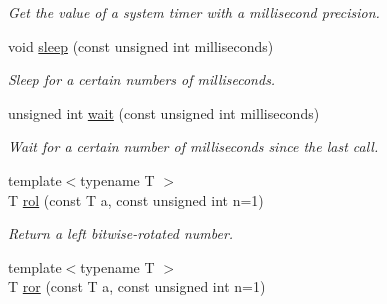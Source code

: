 \begin{DoxyCompactItemize}
\begin{DoxyCompactList}\small\item\em Get the value of a system timer with a millisecond precision. \item\end{DoxyCompactList}\item 
void \hyperlink{namespacecimg__library_1_1cimg_a3ac7655e49556a90715f3532af221334}{sleep} (const unsigned int milliseconds)
\begin{DoxyCompactList}\small\item\em Sleep for a certain numbers of milliseconds. \item\end{DoxyCompactList}\item 
unsigned int \hyperlink{namespacecimg__library_1_1cimg_a3c8917c0f12139bff6de6e3e45fc5b77}{wait} (const unsigned int milliseconds)
\begin{DoxyCompactList}\small\item\em Wait for a certain number of milliseconds since the last call. \item\end{DoxyCompactList}\item 
\hypertarget{namespacecimg__library_1_1cimg_ae75f9e2255c8e98eb0cca3b6716f8746}{
{\footnotesize template$<$typename T $>$ }\\T \hyperlink{namespacecimg__library_1_1cimg_ae75f9e2255c8e98eb0cca3b6716f8746}{rol} (const T a, const unsigned int n=1)}
\label{namespacecimg__library_1_1cimg_ae75f9e2255c8e98eb0cca3b6716f8746}

\begin{DoxyCompactList}\small\item\em Return a left bitwise-\/rotated number. \item\end{DoxyCompactList}\item 
\hypertarget{namespacecimg__library_1_1cimg_a93db8c89493d24df38c6578b6ee9980a}{
{\footnotesize template$<$typename T $>$ }\\T \hyperlink{namespacecimg__library_1_1cimg_a93db8c89493d24df38c6578b6ee9980a}{ror} (const T a, const unsigned int n=1)}
\label{namespacecimg__library_1_1cimg_a93db8c89493d24df38c6578b6ee9980a}


\end{DoxyCompactItemize}
